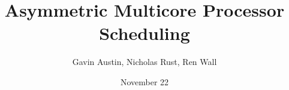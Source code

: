 \documentclass[12pt]{article}
\title{Asymmetric Multicore Processor Scheduling}
\author{Gavin Austin, Nicholas Rust, Ren Wall}
\date{November 22}
\begin{document}
\maketitle

	
	
	
	
	
	
	
	
\newpage
{}

\end{document}
